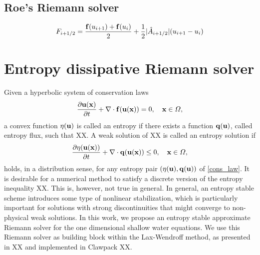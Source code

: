 \documentclass[preprint, 11pt]{article}
\newcommand{\A}{{\mathcal A}}
\newcommand{\bff}{{\bf f}}
\newcommand{\bfu}{{\bf u}}
\newcommand{\bfq}{{\bf q}}
\newcommand{\bfx}{{\bf x}}
\begin{document}
%

\subsection*{Roe's Riemann solver}
\begin{align*}
  F_{i+1/2}=\frac{\bff(u_{i+1})+\bff(u_i)}{2}+\frac{1}{2}|\hat A_{i+1/2}|(u_{i+1}-u_i)
\end{align*}


\clearpage
\section{Entropy dissipative Riemann solver}
Given a hyperbolic system of conservation laws 
\begin{align}\label{cons_law}
  \frac{\partial \bfu(\bfx)}{\partial t} + \nabla\cdot \bff(\bfu(\bfx))=0, \quad \bfx\in\Omega,
\end{align}
a convex function $\eta(\bfu)$ is called an entropy if there exists a function $\bfq(\bfu)$, called 
entropy flux, such that XX. A weak solution of XX is called an entropy solution if 
\begin{align}
  \frac{\partial \eta(\bfu(\bfx))}{\partial t} + \nabla\cdot \bfq(\bfu(\bfx))\leq 0, \quad \bfx\in\Omega,
\end{align}
holds, in a distribution sense, for any entropy pair $(\eta(\bfu),\bfq(\bfu))$ of \eqref{cons_law}.
It is desirable for a numerical method to satisfy a discrete version of the entropy inequality XX. 
This is, however, not true in general. 
In general, an entropy stable scheme introduces some type of nonlinear stabilization, which is 
particularly important for solutions with strong discontinuities that might converge to non-physical 
weak solutions. 
In this work, we propose an entropy stable approximate Riemann solver for the one dimensional 
shallow water equations. We use this Riemann solver as building block within the Lax-Wendroff 
method, as presented in XX and implemented in Clawpack XX.
\end{document}
